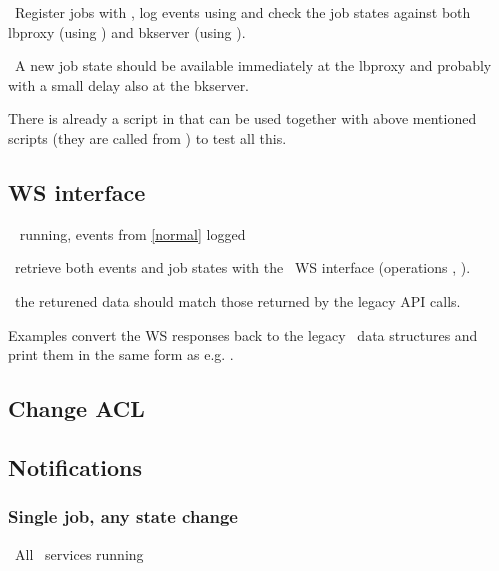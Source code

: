 \how\ Register jobs with , log events
using  and check the job states against
both lbproxy (using ) and bkserver
(using ).

\result\ A new job state should be available immediately at the
lbproxy and probably with a small delay also at the bkserver.

\begin{hints}
There is already a script  in
 that can be used together with
above mentioned scripts  (they are called from
) to test all this.
\end{hints}



\subsection{WS interface}
\req\  running, events from \ref{normal} logged

\how\ retrieve both events and job states with the \LB\ WS interface
(operations , ).

\result\ the returened data should match those returned by the legacy
API calls.

\begin{hints}
Examples  convert the WS
responses back to the legacy \LB\ data structures and print them in
the same form as e.g. .
\end{hints}


\subsection{Change ACL}

\subsection{Notifications}

\subsubsection{Single job, any state change}
\label{notif1}
\req\ All \LB\ services running

